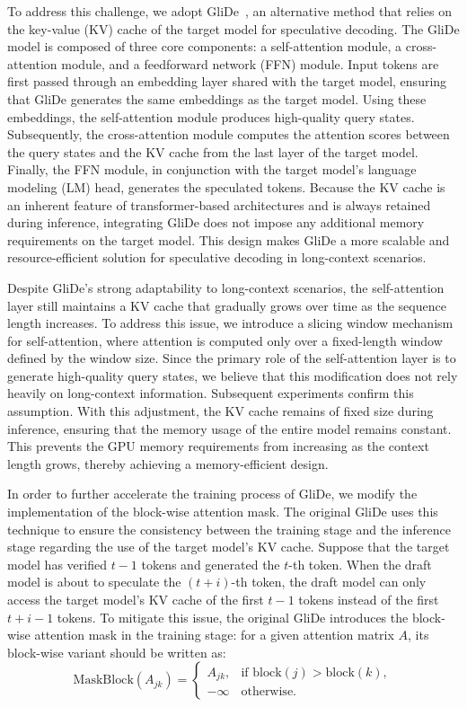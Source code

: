 To address this challenge, we adopt GliDe~\cite{du2024glide}, an alternative method that relies on the key-value (KV) cache of the target model for speculative decoding. The GliDe model is composed of three core components: a self-attention module, a cross-attention module, and a feedforward network (FFN) module. Input tokens are first passed through an embedding layer shared with the target model, ensuring that GliDe generates the same embeddings as the target model. Using these embeddings, the self-attention module produces high-quality query states. Subsequently, the cross-attention module computes the attention scores between the query states and the KV cache from the last layer of the target model. Finally, the FFN module, in conjunction with the target model's language modeling (LM) head, generates the speculated tokens. Because the KV cache is an inherent feature of transformer-based architectures and is always retained during inference, integrating GliDe does not impose any additional memory requirements on the target model. This design makes GliDe a more scalable and resource-efficient solution for speculative decoding in long-context scenarios.

Despite GliDe's strong adaptability to long-context scenarios, the self-attention layer still maintains a KV cache that gradually grows over time as the sequence length increases. To address this issue, we introduce a slicing window mechanism for self-attention, where attention is computed only over a fixed-length window defined by the window size. Since the primary role of the self-attention layer is to generate high-quality query states, we believe that this modification does not rely heavily on long-context information. Subsequent experiments confirm this assumption. With this adjustment, the KV cache remains of fixed size during inference, ensuring that the memory usage of the entire model remains constant. This prevents the GPU memory requirements from increasing as the context length grows, thereby achieving a memory-efficient design.

In order to further accelerate the training process of GliDe, we modify the implementation of the block-wise attention mask. The original GliDe uses this technique to ensure the consistency between the training stage and the inference stage regarding the use of the target model’s KV cache. Suppose that the target model has verified $t-1$ tokens and generated the $t$-th token. When the draft model is about to speculate the $(t+i)$-th token, the draft model can only access the target model's KV cache of the first $t-1$ tokens instead of the first $t+i-1$ tokens. To mitigate this issue, the original GliDe introduces the block-wise attention mask in the training stage: for a given attention matrix $A$, its block-wise variant should be written as:
\begin{equation}
    \mathrm{MaskBlock}\left(A_{jk}\right)=
    \begin{cases} 
        A_{jk}, & \text{if } \mathrm{block}(j)>\mathrm{block}(k), \\
        -\infty & \text{otherwise.}
    \end{cases}
\end{equation}

